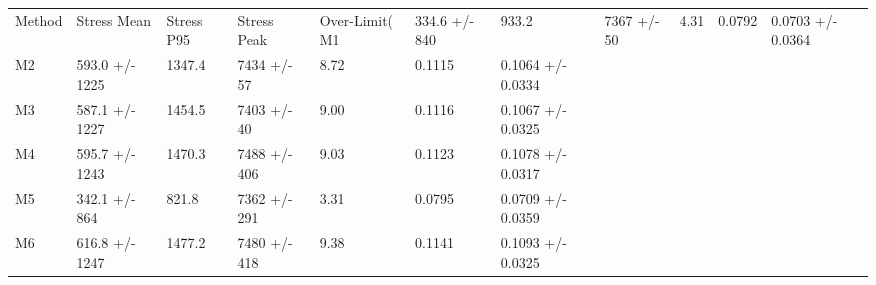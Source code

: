 \begin{tabular}{lllllll}
\toprule
Method & Stress Mean & Stress P95 & Stress Peak & Over-Limit(%
\midrule
M1 & 334.6 +/- 840 & 933.2 & 7367 +/- 50 & 4.31 & 0.0792 & 0.0703 +/- 0.0364 \\
M2 & 593.0 +/- 1225 & 1347.4 & 7434 +/- 57 & 8.72 & 0.1115 & 0.1064 +/- 0.0334 \\
M3 & 587.1 +/- 1227 & 1454.5 & 7403 +/- 40 & 9.00 & 0.1116 & 0.1067 +/- 0.0325 \\
M4 & 595.7 +/- 1243 & 1470.3 & 7488 +/- 406 & 9.03 & 0.1123 & 0.1078 +/- 0.0317 \\
M5 & 342.1 +/- 864 & 821.8 & 7362 +/- 291 & 3.31 & 0.0795 & 0.0709 +/- 0.0359 \\
M6 & 616.8 +/- 1247 & 1477.2 & 7480 +/- 418 & 9.38 & 0.1141 & 0.1093 +/- 0.0325 \\
\bottomrule
\end{tabular}
